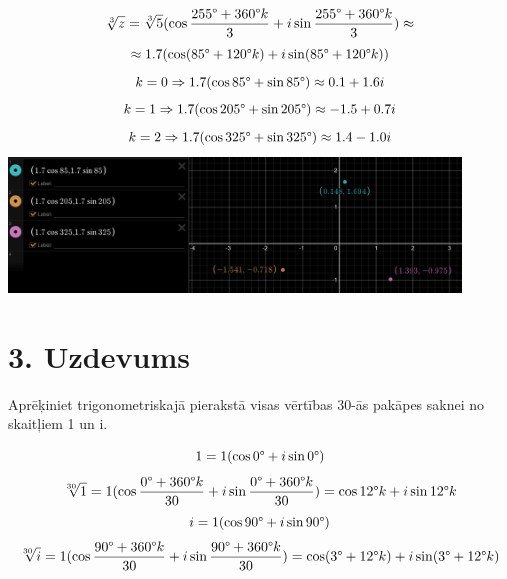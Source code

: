 \documentclass{article}
\begin{document}
\begin{equation*}
    \sqrt[3]{z} = \sqrt[3]{5}(\cos \frac{255 \degree + 360 \degree k}{3} + i \sin \frac{255 \degree + 360 \degree k}{3}) \approx
\end{equation*}
\begin{equation*}
    \approx 1.7(\cos (85 \degree + 120 \degree k) + i \sin (85 \degree + 120 \degree k))
\end{equation*}
\begin{equation*}
    k = 0 \Rightarrow 1.7 (\cos 85 \degree + \sin 85 \degree) \approx 0.1 + 1.6i
\end{equation*}
\begin{equation*}
    k = 1 \Rightarrow 1.7 (\cos 205 \degree + \sin 205 \degree) \approx -1.5 + 0.7i
\end{equation*}
\begin{equation*}
    k = 2 \Rightarrow 1.7 (\cos 325 \degree + \sin 325 \degree) \approx 1.4 - 1.0i
\end{equation*}
\includegraphics[width=0.9\textwidth, center]{3}

\section*{3. Uzdevums}
Aprēķiniet trigonometriskajā pierakstā visas vērtības 30-ās pakāpes saknei no skaitļiem 1 un i.

\begin{equation*}
    1 = 1(\cos 0 \degree + i \sin 0 \degree)
\end{equation*}
\begin{equation*}
    \sqrt[30]{1} = 1(\cos \frac{0 \degree + 360 \degree k}{30} + i \sin \frac{0 \degree + 360 \degree k}{30}) = \cos 12 \degree k + i \sin 12 \degree k
\end{equation*}
\begin{equation*}
    i = 1(\cos 90 \degree + i \sin 90 \degree)
\end{equation*}
\begin{equation*}
    \sqrt[30]{i} = 1(\cos \frac{90 \degree + 360 \degree k}{30} + i \sin \frac{90 \degree + 360 \degree k}{30}) = \cos (3 \degree + 12 \degree k) + i \sin (3 \degree + 12 \degree k)
\end{equation*}
\end{document}
